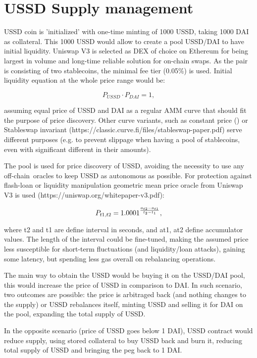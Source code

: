 \section{USSD Supply management}

USSD coin is 'initialized' with one-time minting of 1000 USSD, taking 1000 DAI as collateral. 
This 1000 USSD would allow to create a pool USSD/DAI to have initial liquidity. Uniswap V3 
is selected as DEX of choice on Ethereum for being largest in volume and long-time reliable 
solution for on-chain swaps. As the pair is consisting of two stablecoins, the minimal fee 
tier (0.05\%) is used. Initial liquidity equation at the whole price range would be:

\[ {P_{USSD} \cdot P_{DAI} = 1}, \]

assuming equal price of USSD and DAI as a regular AMM curve that should fit the purpose 
of price discovery. Other curve variants, such as constant price () or Stableswap invariant 
(https://classic.curve.fi/files/stableswap-paper.pdf) serve different purposes (e.g. to 
prevent slippage when having a pool of stablecoins, even with significant different in 
their amounts).

The pool is used for price discovery of USSD, avoiding the necessity to use any off-chain\
oracles to keep USSD as autonomous as possible. For protection against flash-loan or 
liquidity manipulation geometric mean price oracle from Uniswap V3 is used 
(https://uniswap.org/whitepaper-v3.pdf):

\[ P_{ t1,t2 } = 1.0001^{ { a_{t2}-a_{t1} } \over {t_2 - t_1} }, \]

where t2 and t1 are define interval in seconds, and at1, at2 define accumulator values. 
The length of the interval could be fine-tuned, making the assumed price less susceptible 
for short-term fluctuations (and liquidity/loan attacks), gaining some latency, but spending 
less gas overall on rebalancing operations.

The main way to obtain the USSD would be buying it on the USSD/DAI pool, this would increase 
the price of USSD in comparison to DAI. In such scenario, two outcomes are possible: 
the price is arbitraged back (and nothing changes to the supply) or USSD rebalances itself, 
minting USSD and selling it for DAI on the pool, expanding the total supply of USSD.

In the opposite scenario (price of USSD goes below 1 DAI), USSD contract would reduce supply, 
using stored collateral to buy USSD back and burn it, reducing total supply of USSD and 
bringing the peg back to 1 DAI.

